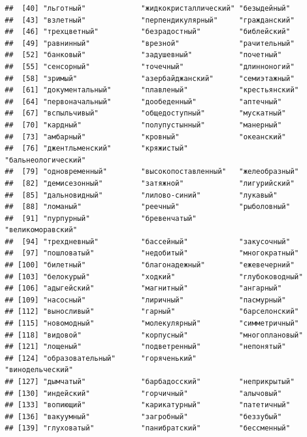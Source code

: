 \documentclass[11pt]{article}\usepackage[]{graphicx}\usepackage[]{color}
\makeatletter
\newenvironment{kframe}{%
 \def\at@end@of@kframe{}%
 \ifinner\ifhmode%
  \def\at@end@of@kframe{\end{minipage}}%
  \begin{minipage}{\columnwidth}%
 \fi\fi%
 \def\FrameCommand##1{\hskip\@totalleftmargin \hskip-\fboxsep
 \colorbox{shadecolor}{##1}\hskip-\fboxsep
     \hskip-\linewidth \hskip-\@totalleftmargin \hskip\columnwidth}%
 \MakeFramed {\advance\hsize-\width
   \@totalleftmargin\z@ \linewidth\hsize
   \@setminipage}}%
 {\par\unskip\endMakeFramed%
 \at@end@of@kframe}
\newenvironment{knitrout}{}{} %
\makeatother
\begin{document}
\begin{knitrout}
\begin{kframe}
\begin{verbatim}
##  [40] "льготный"             "жидкокристаллический" "безыдейный"          
##  [43] "взлетный"             "перпендикулярный"     "гражданский"         
##  [46] "трехцветный"          "безрадостный"         "библейский"          
##  [49] "равнинный"            "врезной"              "рачительный"         
##  [52] "банковый"             "задушевный"           "почетный"            
##  [55] "сенсорный"            "точечный"             "длинноногий"         
##  [58] "зримый"               "азербайджанский"      "семиэтажный"         
##  [61] "документальный"       "плавленый"            "крестьянский"        
##  [64] "первоначальный"       "дообеденный"          "аптечный"            
##  [67] "вспыльчивый"          "общедоступный"        "мускатный"           
##  [70] "кардный"              "полупустынный"        "манерный"            
##  [73] "амбарный"             "кровный"              "океанский"           
##  [76] "джентльменский"       "кряжистый"            "бальнеологический"   
##  [79] "одновременный"        "высокопоставленный"   "желеобразный"        
##  [82] "демисезонный"         "затяжной"             "лигурийский"         
##  [85] "дальновидный"         "лилово-синий"         "лукавый"             
##  [88] "ломаный"              "реечный"              "рыболовный"          
##  [91] "пурпурный"            "бревенчатый"          "великоморавский"     
##  [94] "трехдневный"          "бассейный"            "закусочный"          
##  [97] "пошловатый"           "недобитый"            "многократный"        
## [100] "билетный"             "благонадежный"        "ежевечерний"         
## [103] "белокурый"            "ходкий"               "глубоководный"       
## [106] "адыгейский"           "магнитный"            "ангарный"            
## [109] "насосный"             "лиричный"             "пасмурный"           
## [112] "выносливый"           "гарный"               "барселонский"        
## [115] "новомодный"           "молекулярный"         "симметричный"        
## [118] "видовой"              "корпусный"            "многоплановый"       
## [121] "лощеный"              "подветренный"         "непонятый"           
## [124] "образовательный"      "горяченький"          "винодельческий"      
## [127] "дымчатый"             "барбадосский"         "неприкрытый"         
## [130] "индейский"            "горчичный"            "алычовый"            
## [133] "вопиющий"             "карикатурный"         "патетичный"          
## [136] "вакуумный"            "загробный"            "беззубый"            
## [139] "глуховатый"           "панибратский"         "бессменный"          

\end{verbatim}
\end{kframe}
\end{knitrout}
\end{document}
